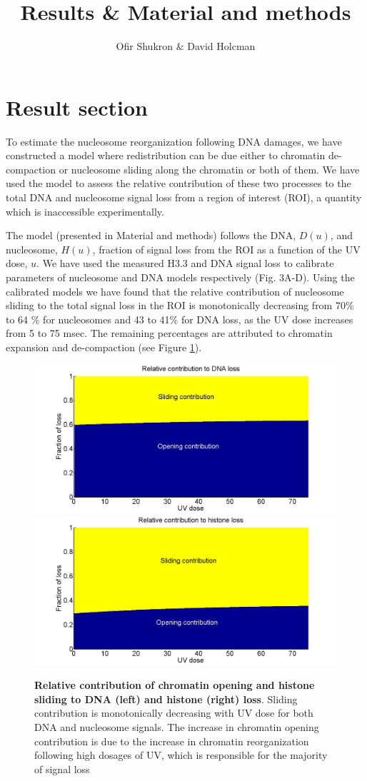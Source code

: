\documentclass[12pt]{article}
\begin{document}
	
\title{Results \& Material and methods}
\author{Ofir Shukron \& David Holcman}
\maketitle

\section{Result section}

To estimate the nucleosome reorganization following DNA damages, we have constructed a model where redistribution can be due either to chromatin de-compaction or nucleosome sliding along the chromatin or both of them. We have used the model to assess the relative contribution of these two processes to the total DNA and nucleosome signal loss from a region of interest (ROI), a quantity which is inaccessible experimentally. 

The model (presented in Material and methods) follows the DNA, $D(u)$, and nucleosome, $H(u)$, fraction of signal loss from the ROI as a function of the UV dose, $u$. We have used the measured H3.3 and DNA signal loss to calibrate parameters of nucleosome and DNA models respectively (Fig. 3A-D). Using the calibrated models we have found that the relative contribution of nucleosome sliding to the total signal loss in the ROI is monotonically decreasing from 70\% to 64 \% for nucleosomes and 43 to 41\% for DNA loss, as the UV dose increases from 5 to 75 msec. The remaining percentages are attributed to chromatin expansion and de-compaction (see Figure \ref{fig:relatiiveContributionToLoss}).

\begin{figure}[H]
	\includegraphics[width=0.5\linewidth, height=0.3\textheight]{relatiiveContributionToDNALoss}
	\includegraphics[width=0.5\linewidth, height=0.3\textheight]{relativeContributionToHistoneLoss}
	\caption{\textbf{Relative contribution of chromatin opening and histone sliding to DNA (left) and histone (right) loss}. Sliding contribution is monotonically decreasing with UV dose for both DNA and nucleosome signals. The increase in chromatin opening contribution is due to the increase in chromatin reorganization following high dosages of UV, which is responsible for the majority of signal loss}
	\label{fig:relatiiveContributionToLoss}
\end{figure}
\end{document}
